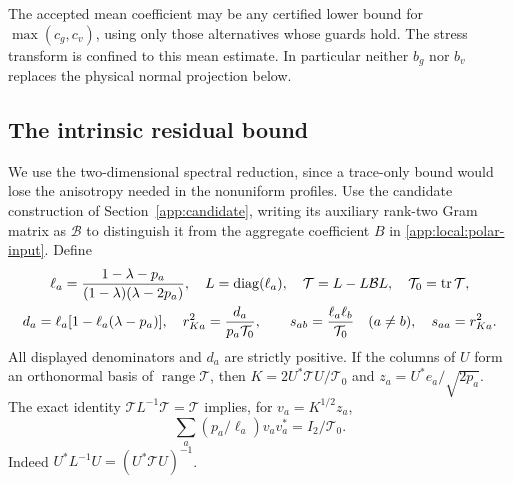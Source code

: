 The accepted mean coefficient may be any certified lower bound for
$\max(c_g,c_v)$, using only those alternatives whose guards hold.
The stress transform is confined to this mean estimate. In particular
neither $b_g$ nor $b_v$ replaces the physical normal projection below.

\subsection{The intrinsic residual bound}
\label{app:local:residual}

We use the two-dimensional spectral reduction, since a trace-only
bound would lose the anisotropy needed in the nonuniform profiles.
Use the candidate construction of Section~\ref{app:candidate}, writing
its auxiliary rank-two Gram matrix as $\mathcal B$ to distinguish it
from the aggregate coefficient $B$ in \eqref{app:local:polar-input}.
Define
\begin{gather}
 \ell_a=\frac{1-\lambda-p_a}{(1-\lambda)(\lambda-2p_a)},\quad
 L=\operatorname{diag}(\ell_a),\quad \mathcal T=L-L\mathcal B L,\quad
 \mathcal T_0=\operatorname{tr}\mathcal T, \notag\\
 d_a=\ell_a[1-\ell_a(\lambda-p_a)],\quad
 r_{Ka}^2=\frac{d_a}{p_a\mathcal T_0},\qquad
 s_{ab}=\frac{\ell_a\ell_b}{\mathcal T_0}\quad(a\ne b),\quad
 s_{aa}=r_{Ka}^2.                                    \label{app:local:intrinsic-scalars}
\end{gather}
All displayed denominators and $d_a$ are strictly positive.
If the columns of $U$ form an orthonormal basis of
$\operatorname{range}\mathcal T$, then
$K=2U^*\mathcal T U/\mathcal T_0$ and
$z_a=U^*e_a/\sqrt{2p_a}$. The exact identity
$\mathcal T L^{-1}\mathcal T=\mathcal T$ implies, for $v_a=K^{1/2}z_a$,
\begin{equation}\label{app:local:weighted-resolution}
 \sum_a(p_a/\ell_a)v_av_a^*=I_2/\mathcal T_0 .
\end{equation}
Indeed $U^*L^{-1}U=(U^*\mathcal T U)^{-1}$.

